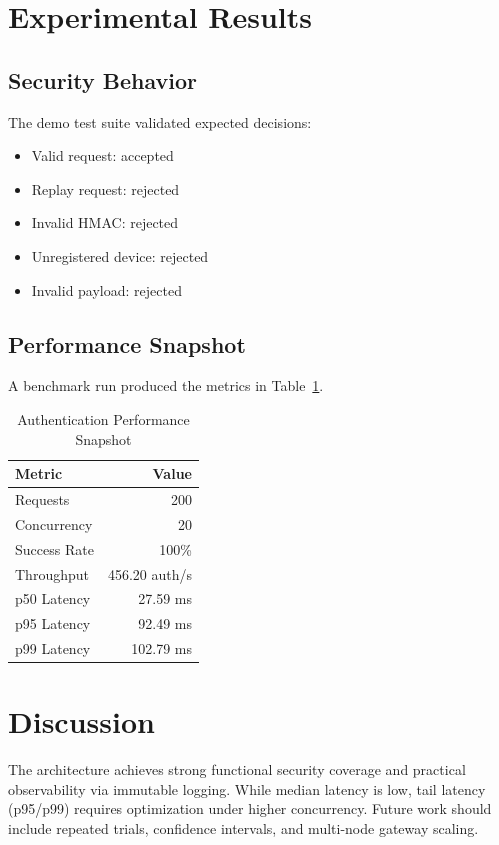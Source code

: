 \documentclass[conference]{IEEEtran}
\begin{document}
\section{Experimental Results}
\subsection{Security Behavior}
The demo test suite validated expected decisions:
\begin{itemize}
\item Valid request: accepted
\item Replay request: rejected
\item Invalid HMAC: rejected
\item Unregistered device: rejected
\item Invalid payload: rejected
\end{itemize}

\subsection{Performance Snapshot}
A benchmark run produced the metrics in Table~\ref{tab:perf}.

\begin{table}[htbp]
\caption{Authentication Performance Snapshot}
\label{tab:perf}
\centering
\begin{tabular}{lr}
\toprule
Metric & Value \\
\midrule
Requests & 200 \\
Concurrency & 20 \\
Success Rate & 100\% \\
Throughput & 456.20 auth/s \\
p50 Latency & 27.59 ms \\
p95 Latency & 92.49 ms \\
p99 Latency & 102.79 ms \\
\bottomrule
\end{tabular}
\end{table}

\section{Discussion}
The architecture achieves strong functional security coverage and practical observability via immutable logging. While median latency is low, tail latency (p95/p99) requires optimization under higher concurrency. Future work should include repeated trials, confidence intervals, and multi-node gateway scaling.
\end{document}
